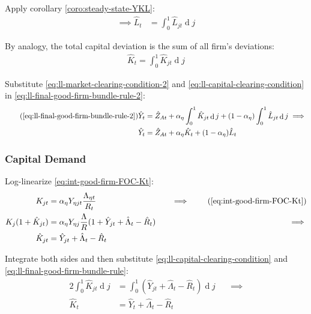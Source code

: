 \documentclass[
	12pt,
	]{article}
\numberwithin{equation}{section}
\DeclareMathOperator{\dif}{d}
\theoremstyle{definition}
\theoremstyle{plain}
\theoremstyle{plain}
\theoremstyle{plain}
\begin{document}
Apply corollary \ref{coro:steady-state-YKL}:
\begin{align}
	\implies \hat{L}_t &= \int_{0}^{1} \hat{L}_{jt} \dif j \label{eq:ll-market-clearing-condition-2}
\end{align}

By analogy, the total capital deviation is the sum of all firm's deviations:
\begin{align}
	\hat{K}_t = \int_{0}^{1} \hat{K}_{jt} \dif j \label{eq:ll-capital-clearing-condition}
\end{align}

Substitute \ref{eq:ll-market-clearing-condition-2} and \ref{eq:ll-capital-clearing-condition} in \ref{eq:ll-final-good-firm-bundle-rule-2}:
\begin{align}
	\tag{\ref{eq:ll-final-good-firm-bundle-rule-2}}
	\hat{Y}_t &= \hat{Z}_{At} + {\alpha_\eta} \int_{0}^{1} \hat{K}_{jt} \dif j + (1-{\alpha_\eta}) \int_{0}^{1} \hat{L}_{jt} \dif j \implies \\
	\hat{Y}_t &= \hat{Z}_{At} + {\alpha_\eta} \hat{K}_t + (1-{\alpha_\eta}) \hat{L}_t \label{eq:ll-final-good-firm-bundle-rule-3}
\end{align}


\subsubsection{Capital Demand}

Log-linearize \ref{eq:int-good-firm-FOC-Kt}:
\begin{alignat}{2}
	K_{jt} &= {\alpha_\eta} Y_{\eta jt} \frac{\Lambda_{\eta t}}{R_t} &\implies \tag{\ref{eq:int-good-firm-FOC-Kt}} \\
	K_j (1+ \hat{K}_{jt}) &= {\alpha_\eta} Y_{\eta j} \frac{\Lambda}{R} (1+ \hat{Y}_{jt} + \hat{\Lambda}_t - \hat{R}_t) \quad &\implies \nonumber \\
	\hat{K}_{jt} &= \hat{Y}_{jt} + \hat{\Lambda}_t - \hat{R}_t \nonumber
\end{alignat}

Integrate both sides and then substitute \ref{eq:ll-capital-clearing-condition} and \ref{eq:ll-final-good-firm-bundle-rule}:
\begin{alignat}{2}
	\int_{0}^{1} \hat{K}_{jt} \dif j &= \int_{0}^{1} \left( \hat{Y}_{jt} + \hat{\Lambda}_t - \hat{R}_t \right) \dif j \quad &\implies \nonumber \\
	\hat{K}_t &= \hat{Y}_t + \hat{\Lambda}_t - \hat{R}_t \label{eq:ll-int-good-firm-FOC-Kt}
\end{alignat}
\end{document}
